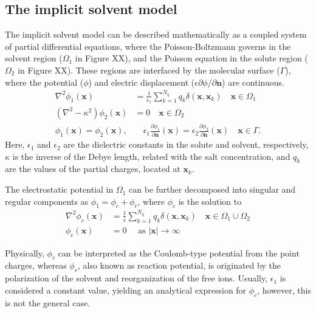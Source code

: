 \subsection*{\sffamily \large The implicit solvent model}

The implicit solvent model can be described mathematically as a coupled system of partial differential equations, where the Poisson-Boltzmann governs in the solvent region ($\Omega_1$ in Figure XX), and the Poisson equation in the solute region ($\Omega_2$ in Figure XX). These regions are interfaced by the molecular surface ($\Gamma$), where the potential ($\phi$) and electric displacement ($\epsilon\partial\phi/\partial\mathbf{n}$) are continuous. 
%
\begin{align}\label{eq:pbe}
\nabla^2\phi_1(\mathbf{x}) &= \frac{1}{\epsilon_1}\sum_{k=1}^{N_q} q_k\delta(\mathbf{x},\mathbf{x}_k) \quad  \mathbf{x} \in \Omega_1\nonumber\\
\left(\nabla^2 - \kappa^2\right)\phi_2(\mathbf{x})  &= 0 \quad\mathbf{x}\in\Omega_2\nonumber\\
\phi_1(\mathbf{x})  = \phi_2 (\mathbf{x}), &\quad \epsilon_1\frac{\partial\phi_1}{\partial\mathbf{n}}(\mathbf{x})  = \epsilon_2\frac{\partial\phi_2}{\partial\mathbf{n}}(\mathbf{x})  \quad \mathbf{x}\in \Gamma. 
\end{align}
%
Here, $\epsilon_1$ and $\epsilon_2$ are the dielectric constants in the solute and solvent, respectively, $\kappa$ is the inverse of the Debye length, related with the salt concentration, and $q_k$ are the values of the partial charges, located at $\mathbf{x}_k$.

The electrostatic potential in $\Omega_1$ can be further decomposed into singular and regular components as $\phi_1 = \phi_c + \phi_r$, where $\phi_c$ is the solution to
%
\begin{align}\label{eq:phic}
\nabla^2\phi_c(\mathbf{x}) &= \frac{1}{\epsilon}\sum_{k=1}^{N_q}q_k\delta(\mathbf{x},\mathbf{x}_k) \quad \mathbf{x}\in\Omega_1\cup\Omega_2\nonumber\\
\phi_c(\mathbf{x})&=0 \quad \text{ as } |\mathbf{x}|\to\infty
\end{align}

Physically, $\phi_c$ can be interpreted as the Coulomb-type potential from the point charges, whereas $\phi_r$, also known as reaction potential, is originated by the polarization of the solvent and reorganization of the free ions. 
Usually, $\epsilon_1$ is considered a constant value, yielding an analytical expression for $\phi_c$, however, this is not the general case.

